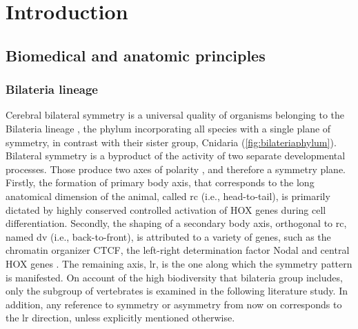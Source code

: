 \chapter{Introduction}
\label{chap:introduction}
\section{Biomedical and anatomic principles}
\subsection{Bilateria lineage}
Cerebral bilateral symmetry is a universal quality of organisms belonging to the Bilateria lineage \cite{Concha2012,Corballis2009}, the phylum incorporating all species with a single plane of symmetry, in contrast with their sister group, Cnidaria (\autoref{fig:bilateriaphylum}). Bilateral symmetry is a byproduct of the activity of two separate developmental processes. Those produce two axes of polarity \cite{Finnerty2003}, and therefore a symmetry plane. Firstly, the formation of primary body axis, that corresponds to the long anatomical dimension of the animal, called \acf{rc} (i.e., head-to-tail), is primarily dictated by highly conserved controlled activation of HOX genes during cell differentiation. Secondly, the shaping of a secondary body axis, orthogonal to \ac{rc}, named \acf{dv} (i.e., back-to-front), is attributed to a variety of genes,  such as the chromatin organizer CTCF, the left-right determination factor Nodal and central HOX genes \cite{Heger2020}. The remaining axis, \acf{lr}, is the one along which the symmetry pattern is manifested. On account of the high biodiversity that bilateria group includes, only the subgroup of vertebrates is examined in the following literature study. In addition, any reference to symmetry or asymmetry from now on corresponds to the \ac{lr} direction, unless explicitly mentioned otherwise.

